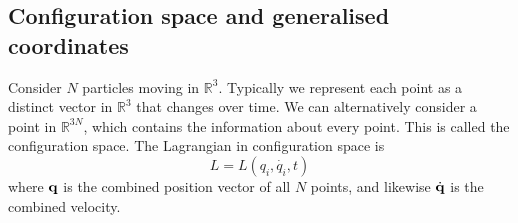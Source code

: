 \subsection{Configuration space and generalised coordinates}
\begin{example}
	Consider \( N \) particles moving in \( \mathbb R^3 \).
	Typically we represent each point as a distinct vector in \( \mathbb R^3 \) that changes over time.
	We can alternatively consider a point in \( \mathbb R^{3N} \), which contains the information about every point.
	This is called the configuration space.
	The Lagrangian in configuration space is
	\[
		L = L(q_i, \dot {q_i}, t)
	\]
	where \( \vb q \) is the combined position vector of all \( N \) points, and likewise \( \dot{\vb q} \) is the combined velocity.
\end{example}
